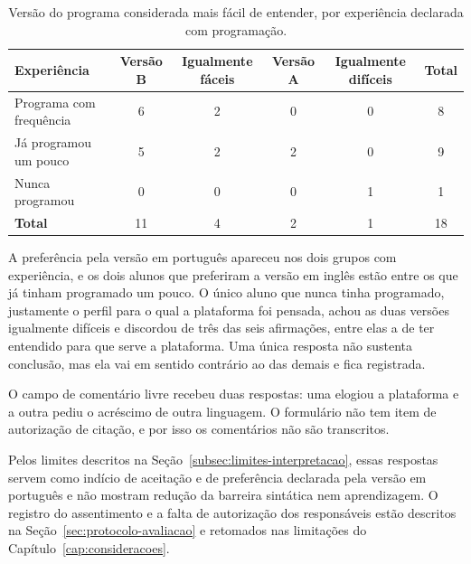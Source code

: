 \begin{table}[htbp]
\centering
\caption{Versão do programa considerada mais fácil de entender, por experiência declarada com programação.}
\label{tab:resultado-versoes}
\footnotesize
\renewcommand{\arraystretch}{1.2}
\begin{tabular}{|p{4.3cm}|c|c|c|c|c|}
\hline
\textbf{Experiência} & \textbf{Versão B} & \textbf{Igualmente fáceis} & \textbf{Versão A} & \textbf{Igualmente difíceis} & \textbf{Total} \\\hline
Programa com frequência & 6 & 2 & 0 & 0 & 8 \\\hline
Já programou um pouco & 5 & 2 & 2 & 0 & 9 \\\hline
Nunca programou & 0 & 0 & 0 & 1 & 1 \\\hline
\textbf{Total} & 11 & 4 & 2 & 1 & 18 \\\hline
\end{tabular}
\end{table}

A preferência pela versão em português apareceu nos dois grupos com experiência, e os dois alunos que preferiram a versão em inglês estão entre os que já tinham programado um pouco. O único aluno que nunca tinha programado, justamente o perfil para o qual a plataforma foi pensada, achou as duas versões igualmente difíceis e discordou de três das seis afirmações, entre elas a de ter entendido para que serve a plataforma. Uma única resposta não sustenta conclusão, mas ela vai em sentido contrário ao das demais e fica registrada.

O campo de comentário livre recebeu duas respostas: uma elogiou a plataforma e a outra pediu o acréscimo de outra linguagem. O formulário não tem item de autorização de citação, e por isso os comentários não são transcritos.

Pelos limites descritos na Seção~\ref{subsec:limites-interpretacao}, essas respostas servem como indício de aceitação e de preferência declarada pela versão em português e não mostram redução da barreira sintática nem aprendizagem. O registro do assentimento e a falta de autorização dos responsáveis estão descritos na Seção~\ref{sec:protocolo-avaliacao} e retomados nas limitações do Capítulo~\ref{cap:consideracoes}.

